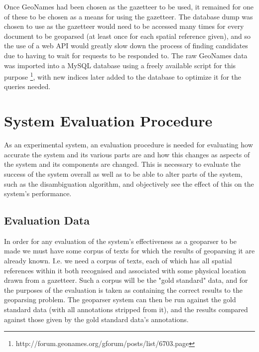 \documentclass[12pt, a4paper]{report}
\begin{document}
Once GeoNames had been chosen as the gazetteer to be used, it remained for one of these to be chosen as a means for using the gazetteer. The database dump was chosen to use as the gazetteer would need to be accessed many times for every document to be geoparsed (at least once for each spatial reference given), and so the use of a web API would greatly slow down the process of finding candidates due to having to wait for requests to be responded to. The raw GeoNames data was imported into a MySQL database using a freely available script for this purpose \footnote{http://forum.geonames.org/gforum/posts/list/6703.page}, with new indices later added to the database to optimize it for the queries needed.



\section{System Evaluation Procedure}
\label{evaluation_procedure}


As an experimental system, an evaluation procedure is needed for evaluating how accurate the system and its various parts are and how this changes as aspects of the system and its components are changed. This is necessary to evaluate the success of the system overall as well as to be able to alter parts of the system, such as the disambiguation algorithm, and objectively see the effect of this on the system's performance.


\subsection{Evaluation Data}

In order for any evaluation of the system's effectiveness as a geoparser to be made we must have some corpus of texts for which the results of geoparsing it are already known. I.e. we need a corpus of texts, each of which has all spatial references within it both recognised and associated with some physical location drawn from a gazetteer. Such a corpus will be the "gold standard" data, and for the purposes of the evaluation is taken as containing the correct results to the geoparsing problem. The geoparser system can then be run against the gold standard data (with all annotations stripped from it), and the results compared against those given by the gold standard data's annotations.
\end{document}
